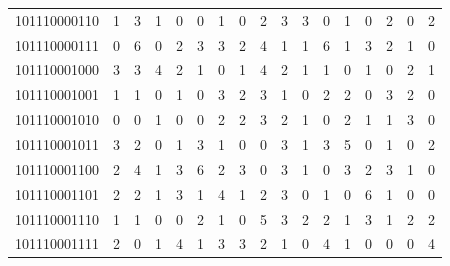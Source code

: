 \documentclass[10pt,a4paper]{article}
\begin{document}
\begin{longtable}{ |c|c|c|c|c|c|c|c|c|c|c|c|c|c|c|c|c| }
    101110000110              & 1                            & 3                                & 1                            & 0                              & 0   & 1   & 0   & 2   & 3   & 3   & 0   & 1   & 0   & 2   & 0   & 2   \\
    101110000111              & 0                            & 6                                & 0                            & 2                              & 3   & 3   & 2   & 4   & 1   & 1   & 6   & 1   & 3   & 2   & 1   & 0   \\
    101110001000              & 3                            & 3                                & 4                            & 2                              & 1   & 0   & 1   & 4   & 2   & 1   & 1   & 0   & 1   & 0   & 2   & 1   \\
    101110001001              & 1                            & 1                                & 0                            & 1                              & 0   & 3   & 2   & 3   & 1   & 0   & 2   & 2   & 0   & 3   & 2   & 0   \\
    101110001010              & 0                            & 0                                & 1                            & 0                              & 0   & 2   & 2   & 3   & 2   & 1   & 0   & 2   & 1   & 1   & 3   & 0   \\
    101110001011              & 3                            & 2                                & 0                            & 1                              & 3   & 1   & 0   & 0   & 3   & 1   & 3   & 5   & 0   & 1   & 0   & 2   \\
    101110001100              & 2                            & 4                                & 1                            & 3                              & 6   & 2   & 3   & 0   & 3   & 1   & 0   & 3   & 2   & 3   & 1   & 0   \\
    101110001101              & 2                            & 2                                & 1                            & 3                              & 1   & 4   & 1   & 2   & 3   & 0   & 1   & 0   & 6   & 1   & 0   & 0   \\
    101110001110              & 1                            & 1                                & 0                            & 0                              & 2   & 1   & 0   & 5   & 3   & 2   & 2   & 1   & 3   & 1   & 2   & 2   \\
    101110001111              & 2                            & 0                                & 1                            & 4                              & 1   & 3   & 3   & 2   & 1   & 0   & 4   & 1   & 0   & 0   & 0   & 4   \\

\end{longtable}
\end{document}
